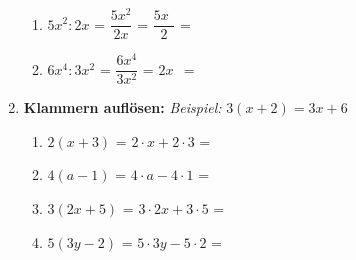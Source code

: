 \begin{enumerate}[label=\arabic*.]
\begin{enumerate}[label=\alph*)]
        \item $5x^2 : 2x$ = $\dfrac{5x^2}{2x}$ = $\dfrac{5x^{\phantom{0}}}{2}$ = \underline{\hspace{3cm}}
        \vspace{0.5cm}

        \item $6x^4 : 3x^2$ = $\dfrac{6x^4}{3x^2}$ = $2x^{\phantom{0}}$ = \underline{\hspace{3cm}}
    \end{enumerate}

    \vspace{1cm}

    \item \textbf{Klammern auflösen:}
    \textit{Beispiel:} $3(x + 2) = 3x + 6$
    \vspace{0.5cm}

    \begin{enumerate}[label=\alph*)]
        \item $2(x + 3)$ = $2 \cdot x + 2 \cdot 3$ = \underline{\hspace{3cm}}
        \vspace{0.5cm}

        \item $4(a - 1)$ = $4 \cdot a - 4 \cdot 1$ = \underline{\hspace{3cm}}
        \vspace{0.5cm}

        \item $3(2x + 5)$ = $3 \cdot 2x + 3 \cdot 5$ = \underline{\hspace{3cm}}
        \vspace{0.5cm}

        \item $5(3y - 2)$ = $5 \cdot 3y - 5 \cdot 2$ = \underline{\hspace{3cm}}
    \end{enumerate}

\end{enumerate}